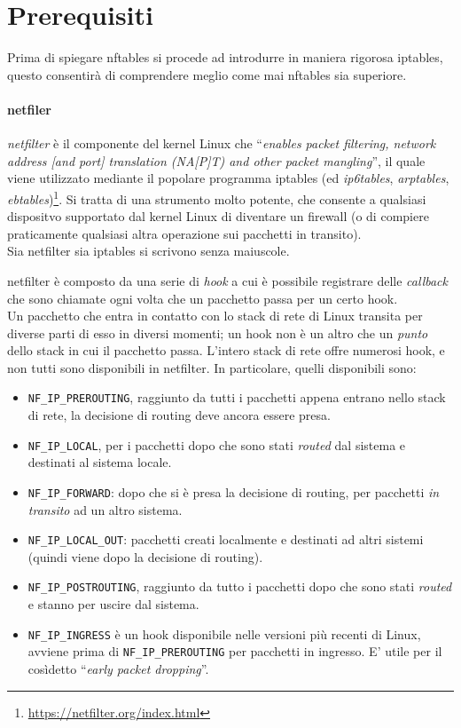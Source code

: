 \section{Prerequisiti}
Prima di spiegare nftables si procede ad introdurre in maniera rigorosa iptables,
questo consentirà di comprendere meglio come mai nftables sia superiore.

\paragraph{netfiler}
\textit{netfilter} è il componente del kernel Linux che
``\textit{enables packet filtering, network address [and port] translation
(NA[P]T) and other packet mangling}'', il quale viene utilizzato mediante il
popolare programma iptables (ed \textit{ip6tables}, \textit{arptables},
\textit{ebtables})\footnote{\url{https://netfilter.org/index.html}}. Si tratta di una strumento molto
potente, che consente a qualsiasi dispositvo supportato dal kernel Linux
di diventare un firewall (o di compiere praticamente qualsiasi altra operazione
sui pacchetti in transito).\\
Sia netfilter sia iptables si scrivono senza maiuscole.


netfilter è composto da una serie di \textit{hook} a cui è possibile registrare
delle \textit{callback} che sono chiamate ogni volta che un pacchetto passa per
un certo hook. \cite{digitalocean-iptables} \\
Un pacchetto che entra in contatto con lo stack di rete di Linux transita per
diverse parti di esso in diversi momenti; un hook non è un altro che un \textit{punto} dello stack
in cui il pacchetto passa.
L'intero stack di rete offre numerosi hook, e non tutti sono disponibili in netfilter.
In particolare, quelli disponibili sono:
\begin{itemize}
  \item \texttt{NF\_IP\_PREROUTING}, raggiunto da tutti i pacchetti appena entrano nello
  stack di rete, la decisione di routing deve ancora essere presa.
  \item \texttt{NF\_IP\_LOCAL}, per i pacchetti dopo che sono stati \textit{routed}
  dal sistema e destinati al sistema locale.
  \item \texttt{NF\_IP\_FORWARD}: dopo che si è presa la decisione di routing,
  per pacchetti \textit{in transito} ad un altro sistema.
  \item \texttt{NF\_IP\_LOCAL\_OUT}: pacchetti creati localmente e destinati ad
  altri sistemi (quindi viene dopo la decisione di routing).
  \item \texttt{NF\_IP\_POSTROUTING}, raggiunto da tutto i pacchetti dopo che
  sono stati \textit{routed} e stanno per uscire dal sistema.
  \item \texttt{NF\_IP\_INGRESS} è un hook disponibile nelle versioni più recenti di
  Linux, avviene prima di \texttt{NF\_IP\_PREROUTING} per pacchetti in ingresso.
  E' utile per il cosìdetto ``\textit{early packet dropping}''\cite{netfilter-hooks}.
\end{itemize}

